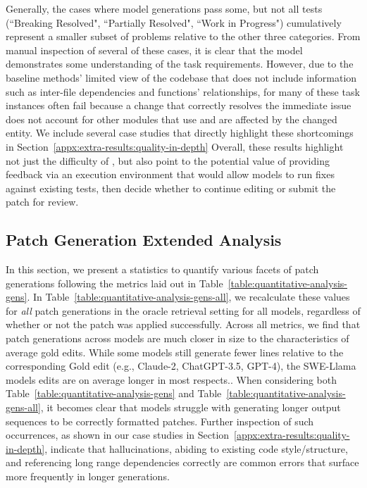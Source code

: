 

Generally, the cases where model generations pass some, but not all tests (``Breaking Resolved", ``Partially Resolved", ``Work in Progress") cumulatively represent a smaller subset of problems relative to the other three categories.
From manual inspection of several of these cases, it is clear that the model demonstrates some understanding of the task requirements.
However, due to the baseline methods' limited view of the codebase that does not include information such as inter-file dependencies and functions' relationships, for many of these task instances often fail because a change that correctly resolves the immediate issue does not account for other modules that use and are affected by the changed entity.
We include several case studies that directly highlight these shortcomings in Section~\ref{appx:extra-results:quality-in-depth}
Overall, these results highlight not just the difficulty of \benchmark{}, but also point to the potential value of providing feedback via an execution environment that would allow models to run fixes against existing tests, then decide whether to continue editing or submit the patch for review.

\subsection{Patch Generation Extended Analysis}
In this section, we present a statistics to quantify various facets of patch generations following the metrics laid out in Table~\ref{table:quantitative-analysis-gens}.
In Table~\ref{table:quantitative-analysis-gens-all}, we recalculate these values for \textit{all} patch generations in the oracle retrieval setting for all models, regardless of whether or not the patch was applied successfully.
Across all metrics, we find that patch generations across models are much closer in size to the characteristics of average gold edits.
While some models still generate fewer lines relative to the corresponding Gold edit (e.g., Claude-2, ChatGPT-3.5, GPT-4), the SWE-Llama models edits are on average longer in most respects..
When considering both Table~\ref{table:quantitative-analysis-gens} and Table~\ref{table:quantitative-analysis-gens-all}, it becomes clear that models struggle with generating longer output sequences to be correctly formatted patches.
Further inspection of such occurrences, as shown in our case studies in Section~\ref{appx:extra-results:quality-in-depth}, indicate that hallucinations, abiding to existing code style/structure, and referencing long range dependencies correctly are common errors that surface more frequently in longer generations.

